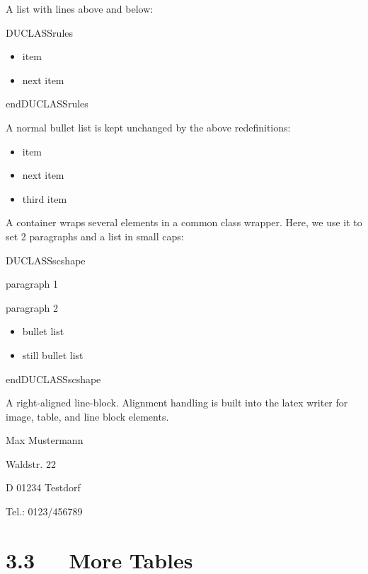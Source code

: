 \documentclass[a4paper]{memoir}
\newenvironment{DUclass}[1]%
  {%
   \def\DocutilsClassFunctionName{DUCLASS#1}
     \csname \DocutilsClassFunctionName \endcsname}%
  {\csname end\DocutilsClassFunctionName \endcsname}%
\newenvironment{DUlineblock}[1]{%
    \list{}{\setlength{\partopsep}{\parskip}
            \addtolength{\partopsep}{\baselineskip}
            \setlength{\topsep}{0pt}
            \setlength{\itemsep}{0.15\baselineskip}
            \setlength{\parsep}{0pt}
            \setlength{\leftmargin}{#1}}
    \raggedright
  }
  {\endlist}
\begin{document}
A list with lines above and below:

\begin{DUclass}{rules}
\begin{itemize}
\item item

\item next item
\end{itemize}
\end{DUclass}

A normal bullet list is kept unchanged by the above redefinitions:

\begin{itemize}
\item item

\item next item

\item third item
\end{itemize}

A container wraps several elements in a common \textquotedbl{}class wrapper\textquotedbl{}. Here, we use
it to set 2 paragraphs and a list in small caps:

\newcommand*{\DUCLASSscshape}{\scshape}

\begin{DUclass}{scshape}

paragraph 1

paragraph 2

\begin{itemize}
\item bullet list

\item still bullet list
\end{itemize}
\end{DUclass}

A right-aligned line-block. Alignment handling is built into the latex
writer for image, table, and line block elements.

\begin{DUlineblock}{0em}
\raggedleft
\item[] Max Mustermann
\item[] Waldstr. 22
\item[] D 01234 Testdorf
\item[] Tel.: 0123/456789
\end{DUlineblock}


\section{3.3   More Tables%
  \label{more-tables}%
}
\end{document}
